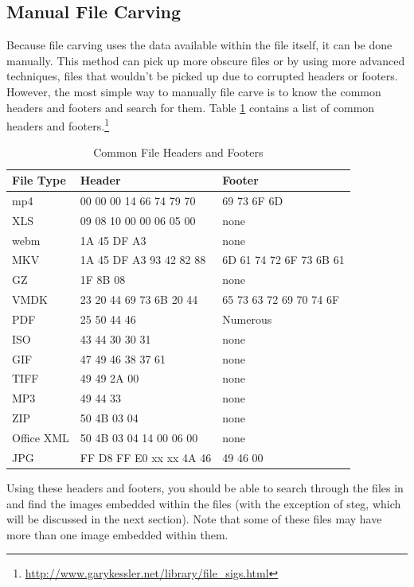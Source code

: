		\subsection{Manual File Carving}
			Because file carving uses the data available within the file itself, it can be done manually. 
			This method can pick up more obscure files or by using more advanced techniques, files that wouldn't be picked up due to corrupted headers or footers. 
			However, the most simple way to manually file carve is to know the common headers and footers and search for them. 
			Table \ref{tab:FileCarvingHeaders} contains a list of common headers and footers.\footnote{\url{http://www.garykessler.net/library/file\_sigs.html}} 
			\begin{table}[htb]
				\centering
				\begin{adjustbox}{max width=1\textwidth}
				\begin{tabular}{| l | l | l |}
					\hline
					\textbf{File Type} & \textbf{Header} & \textbf{Footer} \\ \hline
					mp4	& 00 00 00 14 66 74 79 70	& 69 73 6F 6D \\ \hline
					XLS	& 09 08 10 00 00 06 05 00	& none \\ \hline
					webm& 1A 45 DF A3				& none \\ \hline
					MKV & 1A 45 DF A3 93 42 82 88	& 6D 61 74 72 6F 73 6B 61 \\ \hline
					GZ	& 1F 8B 08					& none \\ \hline
					VMDK& 23 20 44 69 73 6B 20 44	& 65 73 63 72 69 70 74 6F \\ \hline
					PDF & 25 50 44 46				& Numerous \\ \hline
					ISO	& 43 44 30 30 31			& none \\ \hline
					GIF & 47 49 46 38 37 61			& none \\ \hline
					TIFF& 49 49 2A 00				& none \\ \hline
					MP3	& 49 44 33					& none \\ \hline
					ZIP & 50 4B 03 04				& none \\ \hline
					Office XML & 50 4B 03 04 14 00 06 00 & none \\ \hline
					JPG & FF D8 FF E0 xx xx 4A 46	& 49 46 00 \\ \hline
				\end{tabular}
			\end{adjustbox}
				\caption{Common File Headers and Footers}
				\label{tab:FileCarvingHeaders}
			\end{table}
			Using these headers and footers, you should be able to search through the files in  %
			and find the images embedded within the files (with the exception of steg, which will be discussed in the next section).
			Note that some of these files may have more than one image embedded within them. 

